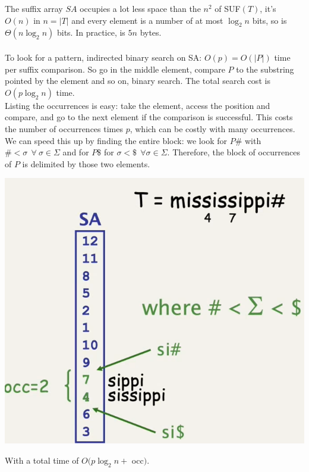 \documentclass[10pt]{report}
\begin{document}
The suffix array $SA$ occupies a lot less space than the $n^2$ of SUF$(T)$, it's $O(n)$ in $n = |T|$ and every element is a number of at most $\log_2 n$ bits, so is $\Theta(n\log_2 n)$ bits. In practice, is $5n$ bytes.\\\\
To look for a pattern, indirected binary search on SA: $O(p) = O(|P|)$ time per suffix comparison. So go in the middle element, compare $P$ to the substring pointed by the element and so on, binary search. The total search cost is $O(p\log_2 n)$ time.\\
Listing the occurrences is easy: take the element, access the position and compare, and go to the next element if the comparison is successful. This costs the number of occurrences times $p$, which can be costly with many occurrences. We can speed this up by finding the entire block: we look for $P\#$ with $\#<\sigma\:\:\forall\:\sigma\in\Sigma$ and for $P\$$ for $\sigma < \$\:\:\forall\sigma\in\Sigma$. Therefore, the block of occurrences of $P$ is delimited by those two elements.
\begin{center}
	\includegraphics[scale=0.5]{20.png}
\end{center}
With a total time of $O(p\log_2 n +$ occ$)$.
\end{document}
